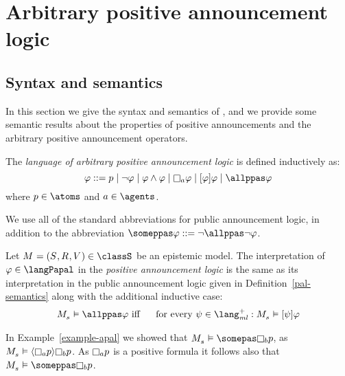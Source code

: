 \chapter{Arbitrary positive announcement logic}\label{papal}

\section{Syntax and semantics}\label{syntax-semantics}

In this section we give the syntax and semantics of \logicPapalS{}, and we provide some semantic results about the properties of positive announcements and the arbitrary positive announcement operators.

\begin{definition}\label{papal-syntax}
The {\em language of arbitrary positive announcement logic \langPapal{}} is defined inductively as:
$$
    \phi ::=
        \atomP \mid
        \neg \phi \mid
        \phi \land \phi \mid
        \necessaryA \phi \mid
        \announceA{\phi} \phi \mid
        \allppas \phi
$$
where $\atomP \in \atoms$ and $\agentA \in \agents$.
\end{definition}

We use all of the standard abbreviations for public announcement logic, in addition to the abbreviation $\someppas \phi ::= \neg \allppas \neg \phi$.

\begin{definition}\label{papal-semantics}
Let $\kModelAndTuple \in \classS$ be an epistemic model.
The interpretation of $\phi \in \langPapal$ in the {\em positive announcement logic \logicPapalS{}} is the same as its interpretation in the public announcement logic \logicPalS{} given in Definition~\ref{pal-semantics} along with the additional inductive case:
\begin{eqnarray*}
    \kPModel{\kStateS} \entails \allppas \phi &\text{ iff }& \text{ for every } \psi \in \langMlPlus : \kPModel{\kStateS} \entails \announceA{\psi} \phi
\end{eqnarray*}
\end{definition}

\begin{example}\label{example-papal}
In Example~\ref{example-apal} we showed that $\kPModel{\kStateS} \entails \somepas \knowsB \atomP$, as $\kPModel{\kStateS} \entails \announceE{\knowsA \atomP} \knowsB \atomP$.
As $\knowsA \atomP$ is a positive formula it follows also that $\kPModel{\kStateS} \entails \someppas \knowsB \atomP$.
\end{example}

